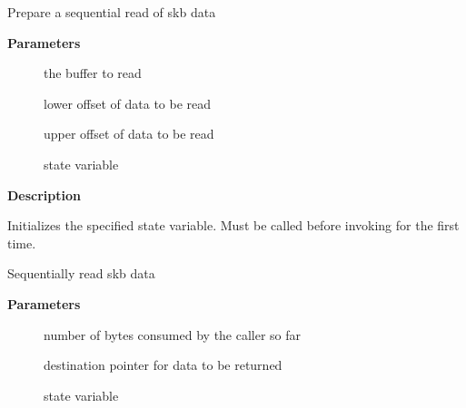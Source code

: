 \documentclass[a4paper,8pt,english]{sphinxmanual}
\begin{document}
\begin{fulllineitems}
\label{networking/kapi:c.skb_prepare_seq_read}
Prepare a sequential read of skb data

\end{fulllineitems}


\textbf{Parameters}
\begin{description}
\item[{}] \leavevmode
the buffer to read

\item[{}] \leavevmode
lower offset of data to be read

\item[{}] \leavevmode
upper offset of data to be read

\item[{}] \leavevmode
state variable

\end{description}

\textbf{Description}

Initializes the specified state variable. Must be called before
invoking {\hyperref[networking/kapi:c.skb_seq_read]{\emph{}}} for the first time.

\begin{fulllineitems}
\label{networking/kapi:c.skb_seq_read}
Sequentially read skb data

\end{fulllineitems}


\textbf{Parameters}
\begin{description}
\item[{}] \leavevmode
number of bytes consumed by the caller so far

\item[{}] \leavevmode
destination pointer for data to be returned

\item[{}] \leavevmode
state variable

\end{description}
\end{document}
